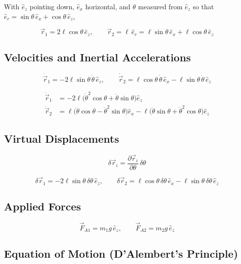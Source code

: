 \documentclass[11pt]{article}
\begin{document}
With $\hat e_z$ pointing down, $\hat e_x$ horizontal, and $\theta$ measured from $\hat e_z$ so that $\hat e_r = \sin\theta\,\hat e_x+\cos\theta\,\hat e_z$,
\begin{result}
\[
    \vec r_1 = 2\ell\cos\theta\,\hat e_z,
    \qquad
    \vec r_2 = \ell\,\hat e_r = \ell\sin\theta\,\hat e_x + \ell\cos\theta\,\hat e_z
\]
\end{result}

\subsection*{Velocities and Inertial Accelerations}

\[
    \dot{\vec r}_1 = -2\ell\sin\theta\,\dot\theta\,\hat e_z,
    \qquad
    \dot{\vec r}_2 = \ell\cos\theta\,\dot\theta\,\hat e_x - \ell\sin\theta\,\dot\theta\,\hat e_z
\]
\begin{result}
\begin{align*}
    \ddot{\vec r}_1 &= -2\ell\big(\dot\theta^{2}\cos\theta+\ddot\theta\sin\theta\big)\hat e_z\\
    \ddot{\vec r}_2 &= \ell\big(\ddot\theta\cos\theta-\dot\theta^{2}\sin\theta\big)\hat e_x
        - \ell\big(\ddot\theta\sin\theta+\dot\theta^{2}\cos\theta\big)\hat e_z
\end{align*}
\end{result}

\subsection*{Virtual Displacements}

\[
    \delta\vec r_i = \frac{\partial\vec r_i}{\partial\theta}\,\delta\theta
\]
\begin{result}
\[
    \delta\vec r_1 = -2\ell\sin\theta\,\delta\theta\,\hat e_z,
    \qquad
    \delta\vec r_2 = \ell\cos\theta\,\delta\theta\,\hat e_x - \ell\sin\theta\,\delta\theta\,\hat e_z
\]
\end{result}

\subsection*{Applied Forces}

\begin{result}
\[
    \vec F_{A1} = m_1 g\,\hat e_z,
    \qquad
    \vec F_{A2} = m_2 g\,\hat e_z
\]
\end{result}

\subsection*{Equation of Motion (D'Alembert's Principle)}
\end{document}
